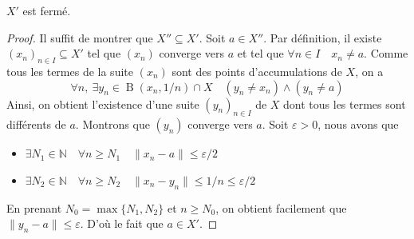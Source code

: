 \begin{lemme}
    $X'$ est fermé.
\end{lemme}
\begin{proof}
    Il suffit de montrer que $X''\subseteq  X'$. Soit $a\in X''$. Par définition, il existe $(x_n)_{n\in I}\subseteq X'$ tel que $(x_n)$ converge vers $a$ et tel que $\forall n\in I \quad x_n\neq a$. Comme tous les termes de la suite $(x_n)$ sont des points d'accumulations de $X$, on a
    \[
    \forall n,\:\exists y_n\in \operatorname{B}\left(x_n,1/n\right)\cap X \quad (y_n\neq x_n)\land (y_n\neq a)
    \]
    Ainsi, on obtient l'existence d'une suite $(y_n)_{n\in I}$ de $X$ dont tous les termes sont différents de $a$. Montrons que $(y_n)$ converge vers $a$. Soit $\varepsilon>0$, nous avons que
    \begin{itemize}
        \item $\exists N_1\in \mathbb{N} \quad \forall n\ge N_1 \quad \|x_n-a\|\leq \varepsilon/2 $
        \item $\exists N_2\in \mathbb{N} \quad \forall n\ge N_2 \quad \|x_n-y_n\|\leq 1/n\leq \varepsilon/2$
    \end{itemize}
    En prenant $N_0= \max\{N_1,N_2\}$ et $n\ge N_0$, on obtient facilement que $\|y_n-a\|\le \varepsilon$. D'où le fait que $a\in X'$.
\end{proof}



